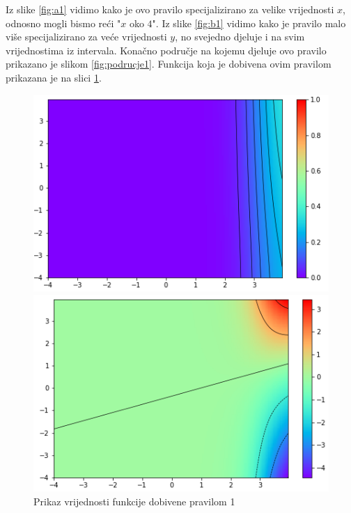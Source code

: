 \documentclass[12pt, a4paper, numeric]{article}
\begin{document}
Iz slike \ref{fig:a1} vidimo kako je ovo pravilo specijalizirano za velike vrijednosti $x$, odnosno mogli bismo reći "$x$ oko $4$".
Iz slike \ref{fig:b1} vidimo kako je pravilo malo više specijalizirano za veće vrijednosti $y$, no svejedno djeluje i na svim vrijednostima iz intervala.
Konačno područje na kojemu djeluje ovo pravilo prikazano je slikom \ref{fig:podrucje1}.
Funkcija koja je dobivena ovim pravilom prikazana je na slici \ref{fig:rule1}.
\begin{figure}[!ht]
    \centering
    \begin{minipage}{.5\textwidth}
        \centering
        \includegraphics[width=.9\linewidth]{img/ruleArea1}
        \captionsetup{justification=centering}
        \caption{Prikaz područja na kojemu djeluje pravilo 1}
        \label{fig:podrucje1}
    \end{minipage}%
    \begin{minipage}{.5\textwidth}
        \centering
        \includegraphics[width=.9\linewidth]{img/rule1}
        \captionsetup{justification=centering}
        \caption{Prikaz vrijednosti funkcije dobivene pravilom 1}
        \label{fig:rule1}
    \end{minipage}
\end{figure}
\end{document}
